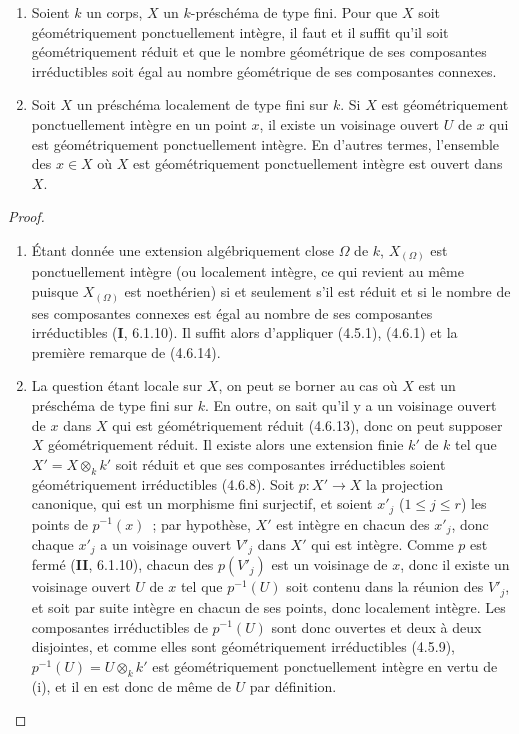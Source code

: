 \begin{proposition}[4.6.15]
\label{IV.2.4.6.15-fr}
\begin{enumerate}
\item[\textup{(i)}] Soient $k$ un corps, $X$ un $k$-préschéma de type fini. Pour que $X$
soit géométriquement ponctuellement intègre, il faut et il suffit qu'il soit
géométriquement réduit et que le nombre géométrique de ses composantes
irréductibles soit égal au nombre géométrique de ses composantes connexes.
\item[\textup{(ii)}] Soit $X$ un préschéma localement de type fini sur $k$. Si $X$ est
géométriquement ponctuellement intègre en un point $x$, il existe un voisinage
ouvert $U$ de $x$ qui est géométriquement ponctuellement intègre. En d'autres
termes, l'ensemble des $x\in X$ où $X$ est géométriquement ponctuellement
intègre est ouvert dans $X$.
\end{enumerate}
\end{proposition}

\begin{proof}
\begin{enumerate}
\item[(i)] Étant donnée une extension algébriquement close $\Omega$ de $k$,
$X_{(\Omega)}$ est ponctuellement intègre (ou localement intègre, ce qui
revient au même puisque $X_{(\Omega)}$ est noethérien) si et seulement s'il est
réduit et si le nombre de ses composantes connexes est égal au nombre de ses
composantes irréductibles (\textbf{I}, 6.1.10). Il suffit alors d'appliquer (4.5.1),
(4.6.1) et la première remarque de (4.6.14).

\item[(ii)] La question étant locale sur $X$, on peut se borner au cas où $X$
est un préschéma de type fini sur $k$. En outre, on sait qu'il y a un voisinage
ouvert de $x$ dans $X$ qui est géométriquement réduit (4.6.13), donc on peut
supposer $X$ géométriquement réduit. Il existe alors une extension finie $k'$
de $k$ tel que $X'=X\otimes_k k'$ soit réduit et que ses composantes
irréductibles soient géométriquement irréductibles (4.6.8). Soit
$p:X'\to X$ la projection canonique, qui est un morphisme fini surjectif, et
soient $x'_j$ ($1\leqslant j\leqslant r$) les points de $p^{-1}(x)$~; par
hypothèse, $X'$ est intègre en chacun des $x'_j$, donc chaque $x'_j$ a un
voisinage ouvert $V'_j$ dans $X'$ qui est intègre. Comme $p$ est fermé
(\textbf{II}, 6.1.10), chacun des $p(V'_j)$ est un voisinage de $x$, donc il existe un
voisinage ouvert $U$ de $x$ tel que $p^{-1}(U)$ soit contenu dans la réunion
des $V'_j$, et soit par suite intègre en chacun de ses points, donc localement
intègre. Les composantes irréductibles de $p^{-1}(U)$ sont donc ouvertes et
deux à deux disjointes, et comme elles sont géométriquement irréductibles
(4.5.9), $p^{-1}(U)=U\otimes_k k'$ est géométriquement ponctuellement intègre
en vertu de (i), et il en est donc de même de $U$ par définition.
\end{enumerate}
\end{proof}

